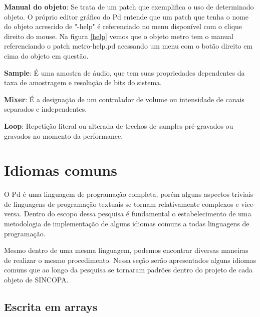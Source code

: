 \documentclass{ppgmus}
\begin{document}
\textbf{Manual do objeto}: Se trata de um patch que exemplifica o uso de determinado
objeto. O próprio editor gráfico do Pd entende que um patch que tenha o nome do objeto 
acrescido de "-help" é referenciado no menu disponível com o clique direito do mouse. 
Na figura \ref{help} vemos que o objeto metro tem o manual
referenciando o patch metro-help.pd acessando um 
menu com o botão direito em cima do objeto em questão.



\textbf{Sample}: É uma amostra de áudio, que tem suas propriedades dependentes da
taxa de amostragem e resolução de bits do sistema.


\textbf{Mixer}: É a designação de um controlador de volume ou intensidade de canais separados 
e independentes.

\textbf{Loop}: Repetição literal ou alterada de trechos de samples pré-gravados ou
gravados no momento da performance.


\section{Idiomas comuns}


O Pd é uma linguagem de programação completa, porém alguns aspectos triviais
de linguagens de programação textuais se tornam relativamente complexos e vice-versa.
Dentro do escopo dessa pesquisa é fundamental o estabelecimento de uma metodologia de
implementação de alguns idiomas comuns a todas linguagens de programação.

Mesmo dentro de uma mesma linguagem, podemos encontrar diversas maneiras
de realizar o mesmo procedimento. Nessa seção serão apresentados alguns idiomas comuns 
que ao longo da pesquisa se tornaram padrões dentro do projeto de cada
objeto de SINCOPA.
 
\subsection{Escrita em arrays}
\end{document}
